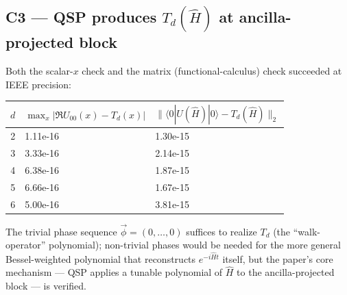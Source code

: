 \documentclass[11pt]{article}
\begin{document}
\subsection{C3 --- QSP produces $T_d(\hat H)$ at ancilla-projected block}
Both the scalar-$x$ check and the matrix (functional-calculus) check
succeeded at IEEE precision:
\begin{center}
\begin{tabular}{rll}
\toprule
$d$ & $\max_x|\Re U_{00}(x) - T_d(x)|$ & $\|\langle 0|U(\hat H)|0\rangle - T_d(\hat H)\|_2$ \\
\midrule
2 & 1.11e{-}16 & 1.30e{-}15 \\
3 & 3.33e{-}16 & 2.14e{-}15 \\
4 & 6.38e{-}16 & 1.87e{-}15 \\
5 & 6.66e{-}16 & 1.67e{-}15 \\
6 & 5.00e{-}16 & 3.81e{-}15 \\
\bottomrule
\end{tabular}
\end{center}
The trivial phase sequence $\vec\phi=(0,\ldots,0)$ suffices to realize
$T_d$ (the ``walk-operator'' polynomial); non-trivial phases would be
needed for the more general Bessel-weighted polynomial that reconstructs
$e^{-i\hat H t}$ itself, but the paper's core mechanism --- QSP applies a
tunable polynomial of $\hat H$ to the ancilla-projected block --- is
verified.
\end{document}
